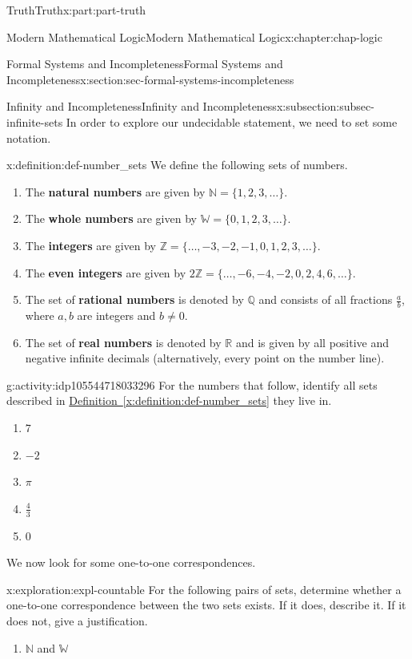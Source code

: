 \documentclass[oneside,10pt,]{book}
\newcommand{\xreffont}{\relax}
\newcommand{\terminology}[1]{\textbf{#1}}
\numberwithin{equation}{section}
\begin{document}
\begin{partptx}{Truth}{}{Truth}{}{}{x:part:part-truth}
\begin{chapterptx}{Modern Mathematical Logic}{}{Modern Mathematical Logic}{}{}{x:chapter:chap-logic}
\begin{sectionptx}{Formal Systems and Incompleteness}{}{Formal Systems and Incompleteness}{}{}{x:section:sec-formal-systems-incompleteness}
\begin{subsectionptx}{Infinity and Incompleteness}{}{Infinity and Incompleteness}{}{}{x:subsection:subsec-infinite-sets}
In order to explore our undecidable statement, we need to set some notation.%
\begin{definition}{}{x:definition:def-number_sets}%
We define the following sets of numbers.%
%
\begin{enumerate}
\item{}The \terminology{natural numbers} are given by \(\mathbb{N} = \{1, 2, 3, \ldots\}\).%
\item{}The \terminology{whole numbers} are given by \(\mathbb{W} = \{0,1,2,3,\ldots\}\).%
\item{}The \terminology{integers} are given by \(\mathbb{Z} = \{\ldots, -3, -2, -1, 0, 1, 2, 3, \ldots\}\).%
\item{}The \terminology{even integers} are given by \(2\mathbb{Z} = \{\ldots, -6, -4, -2, 0, 2, 4, 6, \ldots\}\).%
\item{}The set of \terminology{rational numbers} is denoted by \(\mathbb{Q}\) and consists of all fractions \(\frac{a}{b}\), where \(a,b\) are integers and \(b\ne 0\).%
\item{}The set of \terminology{real numbers} is denoted by \(\mathbb{R}\) and is given by all positive and negative infinite decimals (alternatively, every point on the number line).%
\end{enumerate}
\end{definition}
\begin{activity}{}{g:activity:idp105544718033296}%
For the numbers that follow, identify all sets described in \hyperref[x:definition:def-number_sets]{Definition~{\xreffont\ref{x:definition:def-number_sets}}} they live in.%
%
\begin{enumerate}
\item{}\(\displaystyle 7\)%
\item{}\(\displaystyle -2\)%
\item{}\(\displaystyle \pi\)%
\item{}\(\displaystyle \frac{4}{3}\)%
\item{}\(\displaystyle 0\)%
\end{enumerate}
\end{activity}%
We now look for some one-to-one correspondences.%
\begin{exploration}{}{x:exploration:expl-countable}%
For the following pairs of sets, determine whether a one-to-one correspondence between the two sets exists. If it does, describe it. If it does not, give a justification.%
%
\begin{enumerate}
\item{}\(\mathbb{N}\) and \(\mathbb{W}\)%

\end{enumerate}
\end{exploration}
\end{subsectionptx}
\end{sectionptx}
\end{chapterptx}
\end{partptx}
\end{document}
